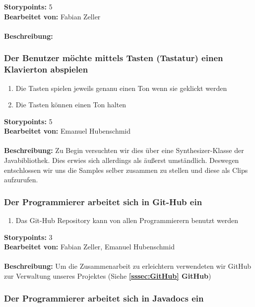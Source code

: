 \textbf{Storypoints:} 5 \\
\textbf{Bearbeitet von:} Fabian Zeller \\
\\
\textbf{Beschreibung:} 


\subsubsection{Der Benutzer möchte mittels Tasten (Tastatur) einen Klavierton abspielen}

\begin{enumerate}
 \item Die Tasten spielen jeweils genanu einen Ton wenn sie geklickt werden
 \item Die Tasten können einen Ton halten
\end{enumerate}

\textbf{Storypoints:} 5 \\
\textbf{Bearbeitet von:} Emanuel Hubenschmid \\
\\
\textbf{Beschreibung:} Zu Begin versuchten wir dies über eine Synthesizer-Klasse der 
Javabibliothek. Dies erwies sich allerdings als äußerst umständlich. Deswegen entschlossen wir uns 
die Samples selber zusammen zu stellen und diese als Clips aufzurufen.


\subsubsection{Der Programmierer arbeitet sich in Git-Hub ein}

\begin{enumerate}
 \item Das Git-Hub Repository kann von allen Programmierern benutzt werden
\end{enumerate}

\textbf{Storypoints:} 3 \\
\textbf{Bearbeitet von:} Fabian Zeller, Emanuel Hubenschmid \\
\\
\textbf{Beschreibung:} Um die Zusammenarbeit zu erleichtern verwendeten wir GitHub zur Verwaltung 
unseres Projektes (Siehe \textbf{\ref{sssec:GitHub} GitHub})


\subsubsection{Der Programmierer arbeitet sich in Javadocs ein}

